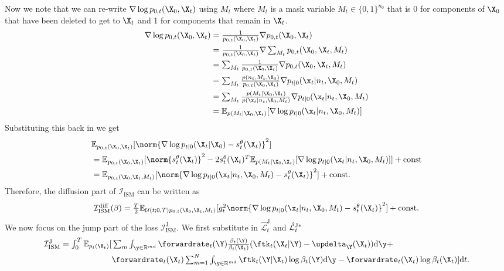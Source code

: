 Now we note that we can re-write $\nabla \log p_{0,t}(\X_0, \X_t)$ using $M_t$ where $M_t$ is a mask variable $M_t \in \{0, 1\}^{n_0}$ that is 0 for components of $\X_0$ that have been deleted to get to $\X_t$ and 1 for components that remain in $\X_t$.
\begin{align}
    \nabla \log p_{0,t}(\X_0, \X_t) &\textstyle = \frac{1}{p_{0,t}(\X_0, \X_t)} \nabla p_{0,t}(\X_0, \X_t) \\
    &\textstyle = \frac{1}{p_{0,t}(\X_0, \X_t)} \nabla \sum_{M_t} p_{0,t}(\X_0, \X_t, M_t)\\
    &\textstyle = \sum_{M_t} \frac{1}{p_{0,t}(\X_0, \X_t)} \nabla p_{0,t}(\X_0, \X_t, M_t)\\
    &\textstyle = \sum_{M_t} \frac{p(n_t, M_t, \X_0)}{p_{0,t}(\X_0, \X_t)} \nabla p_{t|0}(\x_t | n_t, \X_0, M_t)\\
    &\textstyle = \sum_{M_t} \frac{p(M_t | \X_0, \X_t)}{p(\x_t | n_t, \X_0, M_t)} \nabla p_{t|0}(\x_t | n_t, \X_0, M_t)\\
    &\textstyle = \mathbb{E}_{p(M_t | \X_0, \X_t)} [ \nabla \log p_{t|0}(\x_t | n_t, \X_0, M_t) ]
\end{align}
Substituting this back in we get
\begin{align}
     &\textstyle \mathbb{E}_{p_{0, t}(\X_0, \X_t) } [ \norm{ \nabla \log p_{t|0}(\X_t | \X_0) - s_t^\theta(\X_t) }^2 ] \\
     &\textstyle = \mathbb{E}_{p_{0,t}(\X_0, \X_t)} [ \norm{s_t^\theta(\X_t)}^2 - 2 s_t^\theta(\X_t)^T \mathbb{E}_{p(M_t | \X_0, \X_t)} [ \nabla \log p_{t|0}(\x_t | n_t, \X_0, M_t) ] ] + \text{const}\\
     &\textstyle = \mathbb{E}_{p_{0,t}(\X_0, \X_t, M_t)} [ \norm{\nabla \log p_{t|0}(\x_t | n_t, \X_0, M_t) - s_t^\theta(\X_t) }^2 ] + \text{const} . 
\end{align}
Therefore, the diffusion part of $\mathcal{I}_{\text{ISM}}$ can be written as
\begin{equation}
\textstyle     \mathcal{I}_{\text{ISM}}^{\text{diff}}(\beta) = \frac{T}{2} \mathbb{E}_{\mathcal{U}(t; 0, T) p_{0,t}(\X_0, \X_t, M_t) } [g_t^2 \norm{\nabla \log p_{t|0}(\x_t | n_t, \X_0, M_t) - s_t^\theta(\X_t)}^2 ] + \text{const} . 
\end{equation}
We now focus on the jump part of the loss $\mathcal{I}_{\text{ISM}}^{\text{J}}$. We first substitute in $\hat{\mathcal{L}}^{\text{J}}_t$ and $\hat{\mathcal{L}}^{\text{J}* }_t$
\begin{align}
    \textstyle \mathcal{I}_{\text{ISM}}^{\text{J}} = \int_0^T \mathbb{E}_{p_t(\X_t)} [&\textstyle  \sum_m \int_{\y \in \mathbb{R}^{md}} \forwardrate_t(\Y) \frac{\beta_t(\Y)}{\beta_t(\X_t)} ( \ftk_t(\X_t | \Y) - \updelta_{\Y} (\X_t) ) \rmd\y + \\
    &\textstyle \forwardrate_t(\X_t) \inty \ftk_t(\Y | \X_t) \log \beta_t(\Y) \rmd\y - \forwardrate_t(\X_t) \log \beta_t(\X_t)] \rmd t. \label{eq:def_ism_j}
\end{align}
